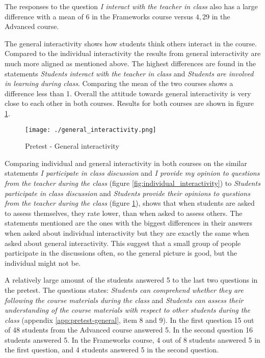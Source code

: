 The responses to the question \emph{I interact with the teacher in class} also has a large difference with a mean of $6$ in the Frameworks course versus $4,29$ in the Advanced course. 


The general interactivity shows how students think others interact in the course. Compared to the individual interactivity the results from general interactivity are much more aligned as mentioned above. The highest differences are found in the statements \emph{Students interact with the teacher in class} and \emph{Students are involved in learning during class}. Comparing the mean of the two courses shows a difference less than 1. Overall the attitude towards general interactivity is very close to each other in both courses. Results for both courses are shown in figure \ref{fig:general_interactivity}.

 \begin{figure}[H]
  \centering
     \texttt{[image: ./general\_interactivity.png]}
     \caption{Pretest - General interactivity}
     \label{fig:general_interactivity}
 \end{figure}

Comparing individual and general interactivity in both courses on the similar statements \emph{I participate in class discussion} and \emph{I provide my opinion to questions from the teacher during the class} (figure \ref{fig:individual_interactivity}) to \emph{Students participate in class discussion} and \emph{Students provide their opinions to questions from the teacher during the class} (figure \ref{fig:general_interactivity}), shows that when students are asked to assess themselves, they rate lower, than when asked to assess others. The statements mentioned are the ones with the biggest differences in their answers when asked about individual interactivity but they are exactly the same when asked about general interactivity. This suggest that a small group of people participate in the discussions often, so the general picture is good, but the individual might not be. 


A relatively large amount of the students answered 5 to the last two questions in the pretest. The questions states: \emph{Students can comprehend whether they are following the course materials during the class} and \emph{Students can assess their understanding of the course materials with respect to other students during the class} (appendix \ref{app:pretest-general}, item 8 and 9). 
In the first question 15 out of 48 students from the Advanced course answered 5. In the second question 16 students answered 5.
In the Frameworks course, 4 out of 8 students answered 5 in the first question, and 4 students answered 5 in the second question.




